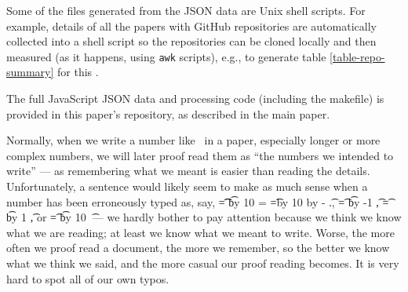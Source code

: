 \documentclass[10pt,a4paper]{article}
\begin{document}
Some of the files generated from the JSON data are Unix shell scripts. For example, details of all the papers with GitHub repositories are automatically collected into a shell script so the repositories can be cloned locally and then measured (as it happens, using \texttt{awk} scripts), e.g., to generate table \ref{table-repo-summary} for this \supplement.

The full JavaScript JSON data and processing code (including the makefile) is provided in this paper's repository, as described in the main paper.


\label{detecting-against-error}

Normally, when we write a number like \the\countUsesVersionControlRepository\ in a paper, especially longer or more complex numbers, we will later proof read them as ``the numbers we intended to write'' --- as remembering what we meant is easier than reading the details. Unfortunately, a sentence would likely seem to make as much sense when a number has been erroneously typed as, say,
\newcount\t
\t=\countUsesVersionControlRepository
\divide \t by 10
\newcount\fraction
\fraction=\countUsesVersionControlRepository
\newcount\tent \tent=\t \multiply \tent by 10
\advance\fraction by -\tent
\the\t.\the\fraction,
\t=\countUsesVersionControlRepository
\advance \t by -1
\the\t,
\t=\countUsesVersionControlRepository
\advance \t by 1
\the\t, or
\t=\countUsesVersionControlRepository
\multiply \t by 10
\the\t\ --- we hardly bother to pay attention because we think we know what we are reading; at least we know what we meant to write. Worse, the more often we proof read a document, the more we remember, so the better we know what we think we said, and the more casual our proof reading becomes. It is very hard to spot all of our own typos. 
\end{document}
